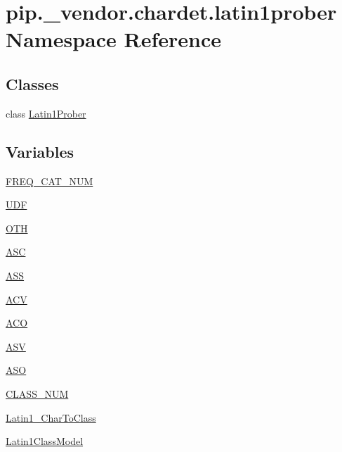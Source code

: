 \hypertarget{namespacepip_1_1__vendor_1_1chardet_1_1latin1prober}{}\section{pip.\+\_\+vendor.\+chardet.\+latin1prober Namespace Reference}
\label{namespacepip_1_1__vendor_1_1chardet_1_1latin1prober}
\subsection*{Classes}
\begin{DoxyCompactItemize}
\item 
class \hyperlink{classpip_1_1__vendor_1_1chardet_1_1latin1prober_1_1Latin1Prober}{Latin1\+Prober}
\end{DoxyCompactItemize}
\subsection*{Variables}
\begin{DoxyCompactItemize}
\item 
\hyperlink{namespacepip_1_1__vendor_1_1chardet_1_1latin1prober_a8280433bb5c8b95f81219d4e626cb530}{F\+R\+E\+Q\+\_\+\+C\+A\+T\+\_\+\+N\+UM}
\item 
\hyperlink{namespacepip_1_1__vendor_1_1chardet_1_1latin1prober_a853f0181de185a854eaed8c1a697084c}{U\+DF}
\item 
\hyperlink{namespacepip_1_1__vendor_1_1chardet_1_1latin1prober_aca43e4bea7388da4898a269f376ae696}{O\+TH}
\item 
\hyperlink{namespacepip_1_1__vendor_1_1chardet_1_1latin1prober_a4fcd1ed25b0c8edb697ce1dba18149da}{A\+SC}
\item 
\hyperlink{namespacepip_1_1__vendor_1_1chardet_1_1latin1prober_a5e366d5895478faa0e323d4bece1fde0}{A\+SS}
\item 
\hyperlink{namespacepip_1_1__vendor_1_1chardet_1_1latin1prober_a363b08d820e99193deaa919f2eeb8eaa}{A\+CV}
\item 
\hyperlink{namespacepip_1_1__vendor_1_1chardet_1_1latin1prober_afcaf84dcc078440540063fcceef7d106}{A\+CO}
\item 
\hyperlink{namespacepip_1_1__vendor_1_1chardet_1_1latin1prober_aba06cc6e24c49f09647a0f23385b836c}{A\+SV}
\item 
\hyperlink{namespacepip_1_1__vendor_1_1chardet_1_1latin1prober_a8847726a3fad6d244c6858637fef8cb0}{A\+SO}
\item 
\hyperlink{namespacepip_1_1__vendor_1_1chardet_1_1latin1prober_a7fbc89b335c72bde8bbac3a4205cd526}{C\+L\+A\+S\+S\+\_\+\+N\+UM}
\item 
\hyperlink{namespacepip_1_1__vendor_1_1chardet_1_1latin1prober_a03944385882fa8506a15badaa663e757}{Latin1\+\_\+\+Char\+To\+Class}
\item 
\hyperlink{namespacepip_1_1__vendor_1_1chardet_1_1latin1prober_a534e94663a2999dd7e72620f19493df2}{Latin1\+Class\+Model}
\end{DoxyCompactItemize}


